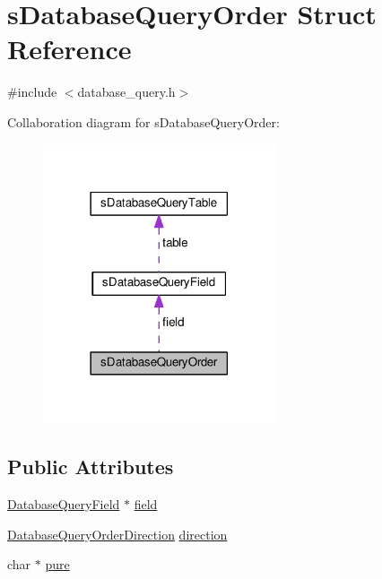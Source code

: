 \hypertarget{structsDatabaseQueryOrder}{}\section{s\+Database\+Query\+Order Struct Reference}
\label{structsDatabaseQueryOrder}


{\ttfamily \#include $<$database\+\_\+query.\+h$>$}



Collaboration diagram for s\+Database\+Query\+Order\+:\nopagebreak
\begin{figure}[H]
\begin{center}
\leavevmode
\includegraphics[width=194pt]{structsDatabaseQueryOrder__coll__graph}
\end{center}
\end{figure}
\subsection*{Public Attributes}
\begin{DoxyCompactItemize}
\item 
\hyperlink{database__query_8h_a88215d743b6fc63a879f730b4523dda1}{Database\+Query\+Field} $\ast$ \hyperlink{structsDatabaseQueryOrder_a4cfafb9043648c011721411cabb1fc22}{field}
\item 
\hyperlink{database__query_8h_ab5c87c88ab31b918df8c891733adb77e}{Database\+Query\+Order\+Direction} \hyperlink{structsDatabaseQueryOrder_a78ffc2b3348fa8f50949885229de3cad}{direction}
\item 
char $\ast$ \hyperlink{structsDatabaseQueryOrder_ac2b2660647eddc285042a724d03b2476}{pure}
\end{DoxyCompactItemize}


